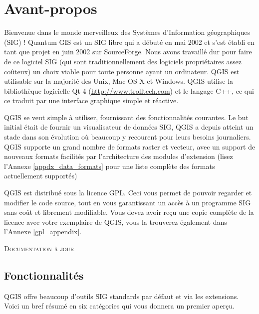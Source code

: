 \section{Avant-propos}\label{label_forward}
\setcounter{page}{1}

Bienvenue dans le monde merveilleux des Systèmes d'Information géographiques (SIG) ! Quantum GIS est un SIG libre qui a débuté en mai 2002 et s'est établi en tant que projet en juin 2002 sur SourceForge. Nous avons travaillé dur pour faire de ce logiciel SIG (qui sont traditionnellement des logiciels propriétaires assez coûteux) un choix viable pour toute personne ayant un ordinateur. QGIS est utilisable sur la majorité des Unix, Mac OS X et Windows. QGIS utilise la bibliothèque logicielle Qt 4 (\url{http://www.trolltech.com}) et le langage C++, ce qui ce traduit par une interface graphique simple et réactive.

QGIS se veut simple à utiliser, fournissant des fonctionnalités courantes. Le but initial était de fournir un visualisateur de données SIG, QGIS a depuis atteint un stade dans son évolution où beaucoup y recourent pour leurs besoins journaliers. QGIS supporte un grand nombre de formats raster et vecteur, avec un support de nouveaux formats facilités par l'architecture des modules d'extension (lisez l'Annexe \ref{appdx_data_formats} pour une liste complète des formats actuellement supportés)

QGIS est distribué sous la licence GPL. Ceci vous permet de pouvoir regarder et modifier le code source, tout en vous garantissant un accès à un programme SIG sans coût et librement modifiable. Vous devez avoir reçu une copie complète de la licence avec votre exemplaire de QGIS, vous la trouverez également dans l'Annexe \ref{gpl_appendix}.

\begin{Astuce}\caption{\textsc{Documentation à jour}}
\end{Astuce}

\subsection{Fonctionnalités}\label{label_majfeat}

QGIS offre beaucoup d'outils SIG standards par défaut et via les extensions. Voici un bref résumé en six catégories qui vous donnera un premier aperçu.

